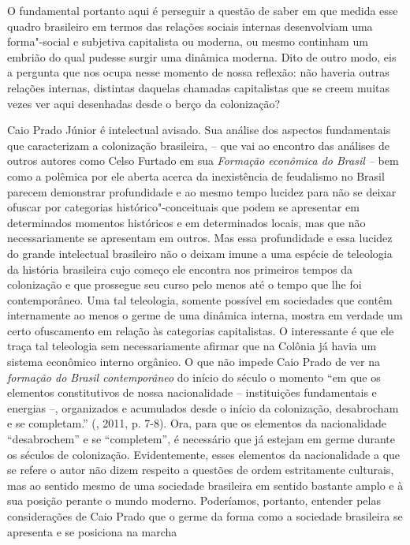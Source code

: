 O fundamental portanto aqui é perseguir a questão de saber em que medida
esse quadro brasileiro em termos das relações sociais internas
desenvolviam uma forma"-social e subjetiva capitalista ou moderna, ou
mesmo continham um embrião do qual pudesse surgir uma dinâmica moderna.
Dito de outro modo, eis a pergunta que nos ocupa nesse momento de nossa
reflexão: não haveria outras relações internas, distintas daquelas
chamadas capitalistas que se creem muitas vezes ver aqui desenhadas
desde o berço da colonização?

Caio Prado Júnior é intelectual avisado. Sua análise dos aspectos
fundamentais que caracterizam a colonização brasileira, -- que vai ao
encontro das análises de outros autores como Celso Furtado em sua
\emph{Formação econômica do Brasil --} bem como a polêmica por ele
aberta acerca da inexistência de feudalismo no Brasil parecem demonstrar
profundidade e ao mesmo tempo lucidez para não se deixar ofuscar por
categorias histórico"-conceituais que podem se apresentar em determinados
momentos históricos e em determinados locais, mas que não
necessariamente se apresentam em outros. Mas essa profundidade e essa
lucidez do grande intelectual brasileiro não o deixam imune a uma
espécie de teleologia da história brasileira cujo começo ele encontra
nos primeiros tempos da colonização e que prossegue seu curso pelo menos
até o tempo que lhe foi contemporâneo. Uma tal teleologia, somente
possível em sociedades que contêm internamente ao menos o germe de
uma dinâmica interna, mostra em verdade um certo ofuscamento em relação
às categorias capitalistas. O interessante é que ele traça tal
teleologia sem necessariamente afirmar que na Colônia já havia um
sistema econômico interno orgânico. O que não impede Caio Prado de ver
na \emph{formação do Brasil contemporâneo} do início do século  o
momento ``em que os elementos constitutivos de nossa nacionalidade --
instituições fundamentais e energias --, organizados e acumulados desde
o início da colonização, desabrocham e se completam.'' (, 2011, p.
7-8). Ora, para que os elementos da nacionalidade ``desabrochem'' e se
``completem'', é necessário que já estejam em germe durante os séculos
de colonização. Evidentemente, esses elementos da nacionalidade a que se
refere o autor não dizem respeito a questões de ordem estritamente
culturais, mas ao sentido mesmo de uma sociedade brasileira em sentido
bastante amplo e à sua posição perante o mundo moderno. Poderíamos,
portanto, entender pelas considerações de Caio Prado que o germe da
forma como a sociedade brasileira se apresenta e se posiciona na marcha
